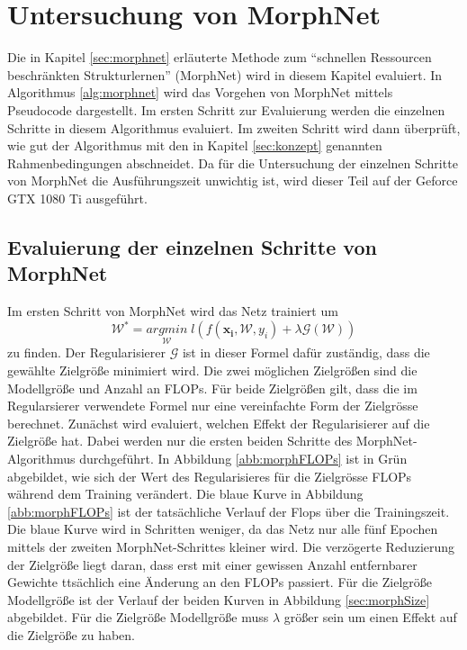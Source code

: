 \chapter{Untersuchung von MorphNet}\label{sec:morphexperimente}

Die in Kapitel \ref{sec:morphnet} erläuterte Methode zum ``schnellen Ressourcen beschränkten Strukturlernen'' (MorphNet) wird in diesem Kapitel evaluiert. In Algorithmus \ref{alg:morphnet} wird das Vorgehen von MorphNet mittels Pseudocode dargestellt. Im ersten Schritt zur Evaluierung werden die einzelnen Schritte in diesem Algorithmus evaluiert. Im zweiten Schritt wird dann überprüft, wie gut der Algorithmus mit den in Kapitel \ref{sec:konzept} genannten Rahmenbedingungen abschneidet. Da für die Untersuchung der einzelnen Schritte von MorphNet die Ausführungszeit unwichtig ist, wird dieser Teil auf der Geforce GTX 1080 Ti ausgeführt.

\section{Evaluierung der einzelnen Schritte von MorphNet}
Im ersten Schritt von MorphNet wird das Netz trainiert um 
\begin{equation}
\mathcal{W}^{\ast}=\underset{\mathcal{W}}{arg min}\; l(f(\mathbf{x_i}, \mathcal{W},y_i) + \lambda \mathcal{G}(\mathcal{W}))
\end{equation}
zu finden. Der Regularisierer $\mathcal{G}$ ist in dieser Formel dafür zuständig, dass die gewählte Zielgröße minimiert wird. Die zwei möglichen Zielgrößen sind die Modellgröße und Anzahl an FLOPs. Für beide Zielgrößen gilt, dass die im Regularsierer verwendete Formel nur eine vereinfachte Form der Zielgrösse berechnet. 
Zunächst wird evaluiert, welchen Effekt der Regularisierer auf die Zielgröße hat. Dabei werden nur die ersten beiden Schritte des MorphNet-Algorithmus durchgeführt.
In Abbildung \ref{abb:morphFLOPs} ist in Grün abgebildet, wie sich der Wert des Regularisieres für die Zielgrösse FLOPs während dem Training verändert. Die blaue Kurve in Abbildung \ref{abb:morphFLOPs} ist der tatsächliche Verlauf der Flops über die Trainingszeit. Die blaue Kurve wird in Schritten weniger, da das Netz nur alle fünf Epochen mittels der zweiten MorphNet-Schrittes kleiner wird. Die verzögerte Reduzierung der Zielgröße liegt daran, dass erst mit einer gewissen Anzahl entfernbarer Gewichte ttsächlich eine Änderung an den FLOPs passiert. Für die Zielgröße Modellgröße ist der Verlauf der beiden Kurven in Abbildung \ref{sec:morphSize} abgebildet. Für die Zielgröße Modellgröße muss $\lambda$ größer sein um einen Effekt auf die Zielgröße zu haben.

